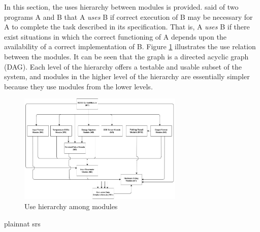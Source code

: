 \documentclass[12pt, titlepage]{article}
\begin{document}
In this section, the uses hierarchy between modules is
provided. \citet{Parnas1978} said of two programs A and B that A {\em uses} B if
correct execution of B may be necessary for A to complete the task described in
its specification. That is, A {\em uses} B if there exist situations in which
the correct functioning of A depends upon the availability of a correct
implementation of B.  Figure \ref{FigUH} illustrates the use relation between
the modules. It can be seen that the graph is a directed acyclic graph
(DAG). Each level of the hierarchy offers a testable and usable subset of the
system, and modules in the higher level of the hierarchy are essentially simpler
because they use modules from the lower levels.

\begin{figure}[H]
\centering
\includegraphics[width=0.7\textwidth]{HierchyModule.jpg}
\caption{Use hierarchy among modules}
\label{FigUH}
\end{figure}


 {plainnat}
 {srs}

\newpage{}
\end{document}
